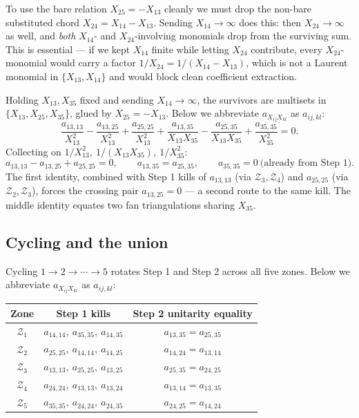 \documentclass[11pt]{article}
\newcommand{\Zr}{\mathcal{Z}}
\begin{document}
To use the bare relation $X_{25}=-X_{13}$ cleanly we must drop the
non-bare substituted chord $X_{24}=X_{14}-X_{13}$.  Sending
$X_{14}\to\infty$ does this: then $X_{24}\to\infty$ as well, and
\emph{both} $X_{14}$- and $X_{24}$-involving monomials drop from
the surviving sum.  This is essential --- if we kept $X_{14}$
finite while letting $X_{24}$ contribute, every $X_{24}$-monomial
would carry a factor $1/X_{24} = 1/(X_{14}-X_{13})$, which is not
a Laurent monomial in $\{X_{13}, X_{14}\}$ and would block clean
coefficient extraction.

Holding $X_{13},X_{35}$ fixed and sending $X_{14}\to\infty$, the
survivors are multisets in $\{X_{13},X_{25},X_{35}\}$, glued by
$X_{25}=-X_{13}$.  Below we abbreviate $a_{X_{ij}X_{kl}}$ as $a_{ij,kl}$:
\[
\frac{a_{13,13}}{X_{13}^2} - \frac{a_{13,25}}{X_{13}^2}
+\frac{a_{25,25}}{X_{13}^2}
+ \frac{a_{13,35}}{X_{13}X_{35}} - \frac{a_{25,35}}{X_{13}X_{35}}
+ \frac{a_{35,35}}{X_{35}^2} = 0.
\]
Collecting on $1/X_{13}^2,\ 1/(X_{13}X_{35}),\ 1/X_{35}^2$:
\[
\boxed{a_{13,13}-a_{13,25}+a_{25,25}=0,\qquad a_{13,35}=a_{25,35},\qquad a_{35,35}=0\ \text{(already from Step 1).}}
\]
The first identity, combined with Step 1 kills of $a_{13,13}$ (via
$\Zr_3,\Zr_4$) and $a_{25,25}$ (via $\Zr_2,\Zr_3$), forces the
crossing pair $a_{13,25}=0$ --- a second route to the same kill.
The middle identity equates two fan triangulations sharing $X_{35}$.

\subsection{Cycling and the union}

Cycling $1\to 2\to\cdots\to 5$ rotates Step 1 and Step 2 across all five zones.  Below we abbreviate $a_{X_{ij}X_{kl}}$ as $a_{ij,kl}$:
\begin{center}\small
\begin{tabular}{c|c|c}
Zone & Step 1 kills & Step 2 unitarity equality\\\hline
$\Zr_1$ & $a_{14,14},\ a_{35,35},\ a_{14,35}$ & $a_{13,35}=a_{25,35}$\\
$\Zr_2$ & $a_{25,25},\ a_{14,14},\ a_{14,25}$ & $a_{14,24}=a_{13,14}$\\
$\Zr_3$ & $a_{13,13},\ a_{25,25},\ a_{13,25}$ & $a_{25,35}=a_{24,25}$\\
$\Zr_4$ & $a_{24,24},\ a_{13,13},\ a_{13,24}$ & $a_{13,14}=a_{13,35}$\\
$\Zr_5$ & $a_{35,35},\ a_{24,24},\ a_{24,35}$ & $a_{24,25}=a_{14,24}$\\
\end{tabular}
\end{center}
\end{document}
